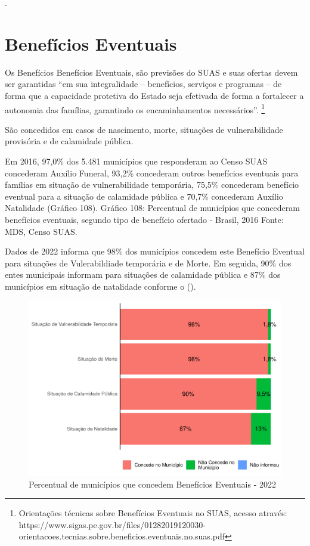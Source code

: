 \documentclass[
  brazilian]{report}
\begin{document}
.

\hypertarget{benefuxedcios-eventuais}{%
\section{Benefícios Eventuais}\label{benefuxedcios-eventuais}}

Os Benefícios Benefícios Eventuais, são previsões do SUAS e suas ofertas
devem ser garantidas ``em sua integralidade -- benefícios, serviços e
programas -- de forma que a capacidade protetiva do Estado seja
efetivada de forma a fortalecer a autonomia das famílias, garantindo os
encaminhamentos necessários''.
\footnote{Orientações técnicas sobre Benefícios Eventuais no
SUAS, acesso através: https://www.sigas.pe.gov.br/files/01282019120030-orientacoes.tecnias.sobre.beneficios.eventuais.no.suas.pdf}

São concedidos em casos de nascimento, morte, situações de
vulnerabilidade provisória e de calamidade pública.

Em 2016, 97,0\% dos 5.481 municípios que responderam ao Censo SUAS
concederam Auxílio Funeral, 93,2\% concederam outros benefícios
eventuais para famílias em situação de vulnerabilidade temporária,
75,5\% concederam benefício eventual para a situação de calamidade
pública e 70,7\% concederam Auxílio Natalidade (Gráfico 108). Gráfico
108: Percentual de municípios que concederam benefícios eventuais,
segundo tipo de benefício ofertado - Brasil, 2016 Fonte: MDS, Censo
SUAS.

Dados de 2022 informa que 98\% dos municípios concedem este Benefício
Eventual para situações de Vulerabildiade temporária e de Morte. Em
seguida, 90\% dos entes municipais informam para situações de calamidade
pública e 87\% dos municípios em situação de natalidade conforme o
().

\begin{figure}
\includegraphics{Censo-SUAS-2022_files/figure-latex/be-munic-1} \caption[Percentual de municípios que concedem Benefícios Eventuais - 2022]{Percentual de municípios que concedem Benefícios Eventuais - 2022}\label{fig:be-munic}
\end{figure}
\end{document}
